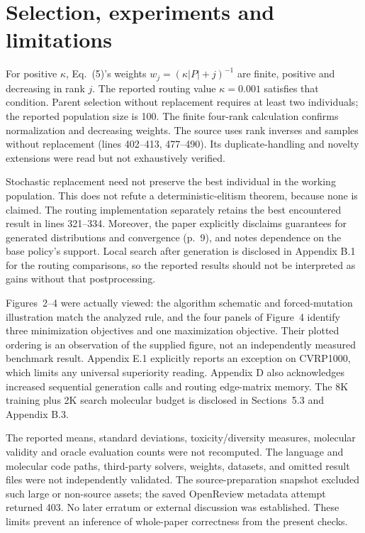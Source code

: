 \documentclass[10pt]{article}
\begin{document}
\section*{Selection, experiments and limitations}
For positive \(\kappa\), Eq. (5)’s weights \(w_j=(\kappa|P|+j)^{-1}\) are finite, positive and decreasing in rank \(j\). The reported routing value \(\kappa=0.001\) satisfies that condition. Parent selection without replacement requires at least two individuals; the reported population size is 100. The finite four-rank calculation confirms normalization and decreasing weights. The source uses rank inverses and samples without replacement (lines 402–413, 477–490). Its duplicate-handling and novelty extensions were read but not exhaustively verified.\par
Stochastic replacement need not preserve the best individual in the working population. This does not refute a deterministic-elitism theorem, because none is claimed. The routing implementation separately retains the best encountered result in lines 321–334. Moreover, the paper explicitly disclaims guarantees for generated distributions and convergence (p. 9), and notes dependence on the base policy’s support. Local search after generation is disclosed in Appendix B.1 for the routing comparisons, so the reported results should not be interpreted as gains without that postprocessing.\par
Figures 2–4 were actually viewed: the algorithm schematic and forced-mutation illustration match the analyzed rule, and the four panels of Figure 4 identify three minimization objectives and one maximization objective. Their plotted ordering is an observation of the supplied figure, not an independently measured benchmark result. Appendix E.1 explicitly reports an exception on CVRP1000, which limits any universal superiority reading. Appendix D also acknowledges increased sequential generation calls and routing edge-matrix memory. The 8K training plus 2K search molecular budget is disclosed in Sections 5.3 and Appendix B.3.\par
The reported means, standard deviations, toxicity/diversity measures, molecular validity and oracle evaluation counts were not recomputed. The language and molecular code paths, third-party solvers, weights, datasets, and omitted result files were not independently validated. The source-preparation snapshot excluded such large or non-source assets; the saved OpenReview metadata attempt returned 403. No later erratum or external discussion was established. These limits prevent an inference of whole-paper correctness from the present checks.\par
\end{document}
